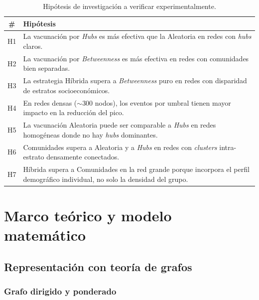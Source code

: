 \documentclass[spanish,notitlepage,letterpaper, 12pt]{article}
\begin{document}
\begin{table}[H]
\centering
\small
\caption{Hip\'otesis de investigaci\'on a verificar experimentalmente.}
\label{tab:hipotesis}
\begin{tabular}{c p{11.5cm}}
\toprule
\textbf{\#} & \textbf{Hip\'otesis} \\
\midrule
H1 & La vacunaci\'on por \textit{Hubs} es m\'as efectiva que la Aleatoria en redes con \textit{hubs} claros. \\
\addlinespace
H2 & La vacunaci\'on por \textit{Betweenness} es m\'as efectiva en redes con comunidades bien separadas. \\
\addlinespace
H3 & La estrategia H\'ibrida supera a \textit{Betweenness} puro en redes con disparidad de estratos socioecon\'omicos. \\
\addlinespace
H4 & En redes densas ($\sim 300$ nodos), los eventos por umbral tienen mayor impacto en la reducci\'on del pico. \\
\addlinespace
H5 & La vacunaci\'on Aleatoria puede ser comparable a \textit{Hubs} en redes homog\'eneas donde no hay \textit{hubs} dominantes. \\
\addlinespace
H6 & Comunidades supera a Aleatoria y a \textit{Hubs} en redes con \textit{clusters} intra-estrato densamente conectados. \\
\addlinespace
H7 & H\'ibrida supera a Comunidades en la red grande porque incorpora el perfil demogr\'afico individual, no solo la densidad del grupo. \\
\bottomrule
\end{tabular}
\end{table}

\newpage
\section{Marco te\'orico y modelo matem\'atico}
\label{sec:marco}

\subsection{Representaci\'on con teor\'ia de grafos}

\subsubsection{Grafo dirigido y ponderado}
\end{document}
